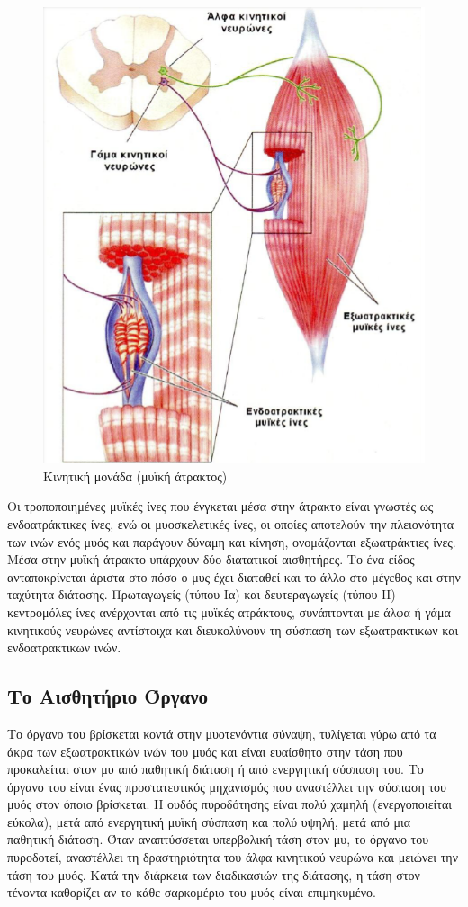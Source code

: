 \begin{figure}[H]
    \centering
    \includegraphics[width=.8\textwidth]{musculoskeletal/fig/muscle-fysiology5.png}
    \caption{Κινητική μονάδα (μυϊκή άτρακτος)}
    \label{fig:muscle-fysiology5}
\end{figure}

Οι τροποποιημένες μυϊκές ίνες που ένγκεται μέσα στην άτρακτο είναι γνωστές ως ενδοατράκτικες ίνες, ενώ οι μυοσκελετικές ίνες, οι οποίες αποτελούν την πλειονότητα των ινών ενός μυός και παράγουν δύναμη και κίνηση, ονομάζονται εξωατράκτιες ίνες. Μέσα στην μυϊκή άτρακτο υπάρχουν δύο διατατικοί αισθητήρες. Το ένα είδος ανταποκρίνεται άριστα στο πόσο ο μυς έχει διαταθεί και το άλλο στο μέγεθος και στην ταχύτητα διάτασης. Πρωταγωγείς (τύπου Ια) και δευτεραγωγείς (τύπου ΙΙ) κεντρομόλες ίνες ανέρχονται από τις μυϊκές ατράκτους, συνάπτονται με άλφα ή γάμα κινητικούς νευρώνες αντίστοιχα και διευκολύνουν τη σύσπαση των εξωατρακτικων και ενδοατρακτικων ινών.

\subsection{\texorpdfstring{Το Αισθητήριο Όργανο }{}}

Το όργανο του  βρίσκεται κοντά στην μυοτενόντια σύναψη, τυλίγεται γύρω από τα άκρα των εξωατρακτικών ινών του μυός και είναι ευαίσθητο στην τάση που προκαλείται στον μυ από παθητική διάταση ή από ενεργητική σύσπαση του. Το όργανο του  είναι ένας προστατευτικός μηχανισμός που αναστέλλει την σύσπαση του μυός στον όποιο βρίσκεται. Η ουδός πυροδότησης είναι πολύ χαμηλή (ενεργοποιείται εύκολα), μετά από ενεργητική μυϊκή σύσπαση και πολύ υψηλή, μετά από μια παθητική διάταση. Όταν αναπτύσσεται υπερβολική τάση στον μυ, το όργανο του  πυροδοτεί, αναστέλλει τη δραστηριότητα του άλφα κινητικού νευρώνα και μειώνει την τάση του μυός. Κατά την διάρκεια των διαδικασιών της διάτασης, η τάση στον τένοντα καθορίζει αν το κάθε σαρκομέριο του μυός είναι επιμηκυμένο.

